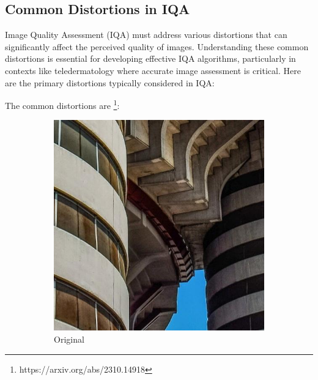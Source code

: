 \subsection{Common Distortions in IQA}
\label{sub:CommonDistortionsIQA}
Image Quality Assessment (IQA) must address various distortions that can significantly affect the perceived quality of images. Understanding these common distortions is essential for developing effective IQA algorithms, particularly in contexts like teledermatology where accurate image assessment is critical. Here are the primary distortions typically considered in IQA: \par
The common distortions are \footnote{https://arxiv.org/abs/2310.14918}:
\begin{figure}[ht]
    \centering
    \begin{subfigure}[b]{0.24\textwidth}
        \includegraphics[width=\textwidth]{img/Original.jpg}
        \caption{Original}
    \end{subfigure}
    \hfill
    \begin{subfigure}[b]{0.24\textwidth}

\end{subfigure}
\end{figure}

